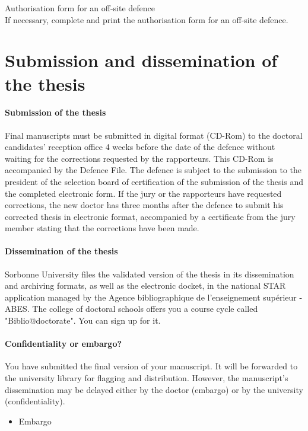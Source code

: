Authorisation form for an off-site defence\\
If necessary, complete and print the authorisation form for an off-site defence. 

\section{Submission and dissemination of the thesis}
\label{sec:submission-and-dissemination}

\paragraph{Submission of the thesis}
Final manuscripts must be submitted in digital format (CD-Rom) to the doctoral candidates' reception office 4 weeks before the date of the defence without waiting for the corrections requested by the rapporteurs. 
This CD-Rom is accompanied by the Defence File. 
The defence is subject to the submission to the president of the selection board of certification of the submission of the thesis and the completed electronic form.
If the jury or the rapporteurs have requested corrections, the new doctor has three months after the defence to submit his corrected thesis in electronic format, accompanied by a certificate from the jury member stating that the corrections have been made.

\paragraph{Dissemination of the thesis}
Sorbonne University files the validated version of the thesis in its dissemination and archiving formats, as well as the electronic docket, in the national STAR application managed by the Agence bibliographique de l'enseignement supérieur - ABES.
The college of doctoral schools offers you a course cycle called "Biblio@doctorate". 
You can sign up for it.

\paragraph{Confidentiality or embargo?}
You have submitted the final version of your manuscript. It will be forwarded to the university library for flagging and distribution. However, the manuscript's dissemination may be delayed either by the doctor (embargo) or by the university (confidentiality).

\begin{itemize}
    \item Embargo
\end{itemize}

